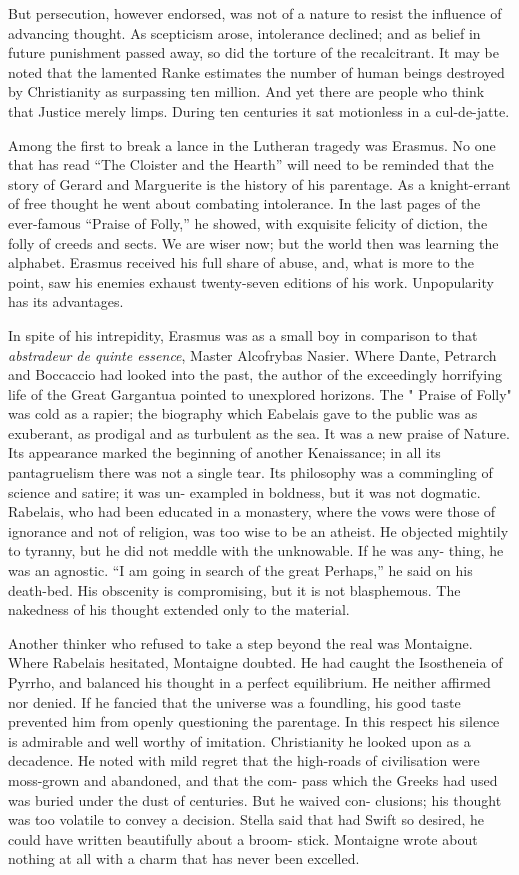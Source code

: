 \documentclass[]{book}
\begin{document}
But persecution, however endorsed, was not of a nature to resist the
influence of advancing thought. As scepticism arose, intolerance
declined; and as belief in future punishment passed away, so did the
torture of the recalcitrant. It may be noted that the lamented Ranke
estimates the number of human beings destroyed by Christianity as
surpassing ten million. And yet there are people who think that Justice
merely limps. During ten centuries it sat motionless in a cul-de-jatte.

Among the first to break a lance in the Lutheran tragedy was Erasmus. No
one that has read ``The Cloister and the Hearth'' will need to be
reminded that the story of Gerard and Marguerite is the history of his
parentage. As a knight-errant of free thought he went about combating
intolerance. In the last pages of the ever-famous ``Praise of Folly,''
he showed, with exquisite felicity of diction, the folly of creeds and
sects. We are wiser now; but the world then was learning the alphabet.
Erasmus received his full share of abuse, and, what is more to the
point, saw his enemies exhaust twenty-seven editions of his work.
Unpopularity has its advantages.

In spite of his intrepidity, Erasmus was as a small boy in comparison to
that \emph{abstradeur de quinte essence}, Master Alcofrybas Nasier.
Where Dante, Petrarch and Boccaccio had looked into the past, the author
of the exceedingly horrifying life of the Great Gargantua pointed to
unexplored horizons. The " Praise of Folly" was cold as a rapier; the
biography which Eabelais gave to the public was as exuberant, as
prodigal and as turbulent as the sea. It was a new praise of Nature. Its
appearance marked the beginning of another Kenaissance; in all its
pantagruelism there was not a single tear. Its philosophy was a
commingling of science and satire; it was un- exampled in boldness, but
it was not dogmatic. Rabelais, who had been educated in a monastery,
where the vows were those of ignorance and not of religion, was too wise
to be an atheist. He objected mightily to tyranny, but he did not meddle
with the unknowable. If he was any- thing, he was an agnostic. ``I am
going in search of the great Perhaps,'' he said on his death-bed. His
obscenity is compromising, but it is not blasphemous. The nakedness of
his thought extended only to the material.

Another thinker who refused to take a step beyond the real was
Montaigne. Where Rabelais hesitated, Montaigne doubted. He had caught
the Isostheneia of Pyrrho, and balanced his thought in a perfect
equilibrium. He neither affirmed nor denied. If he fancied that the
universe was a foundling, his good taste prevented him from openly
questioning the parentage. In this respect his silence is admirable and
well worthy of imitation. Christianity he looked upon as a decadence. He
noted with mild regret that the high-roads of civilisation were
moss-grown and abandoned, and that the com- pass which the Greeks had
used was buried under the dust of centuries. But he waived con-
clusions; his thought was too volatile to convey a decision. Stella said
that had Swift so desired, he could have written beautifully about a
broom- stick. Montaigne wrote about nothing at all with a charm that has
never been excelled.
\end{document}
